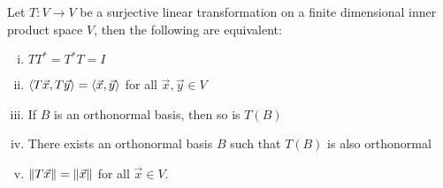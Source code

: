 \begin{theorem}\label{isometryequivalence}
  Let $T : V \to V$ be a surjective linear transformation on a finite dimensional inner product space $V$, then the following are equivalent:
  \begin{enumerate}[i.]
    \item $T T^* = T^* T = I$
    \item $\left\langle T \vec x , T \vec y \right\rangle = \left\langle \vec x , \vec y \right\rangle$ for all $\vec x, \vec y \in V$
    \item If $B$ is an orthonormal basis, then so is $T(B)$
    \item There exists an orthonormal basis $B$ such that $T(B)$ is also orthonormal
    \item $\left\lVert T \vec x\right\rVert = \left\lVert\vec x\right\rVert$ for all $\vec x \in V$.
  \end{enumerate}
\end{theorem}
